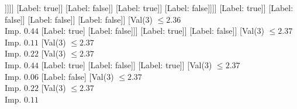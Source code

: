 \documentclass[margin=10pt]{standalone}
\begin{document}
\begin{forest}
																			[Val($3$) $ \leq 2.35$ \\ Imp. $0.04$
																				[Val($3$) $ \leq 2.34$ \\ Imp. $0.01$
																					[Label: false]
																					[Val($3$) $ \leq 2.34$ \\ Imp. $0.05$
																						[Label: true]
																						[Val($3$) $ \leq 2.35$ \\ Imp. $0.01$
																							[Val($3$) $ \leq 2.35$ \\ Imp. $0.07$
																								[Val($3$) $ \leq 2.34$ \\ Imp. $0.02$
																									[Val($3$) $ \leq 2.34$ \\ Imp. $0.10$
																										[Val($3$) $ \leq 2.34$ \\ Imp. $0.02$
																											[Label: false]
																											[Val($3$) $ \leq 2.34$ \\ Imp. $0.15$
																												[Label: true]
																												[Val($3$) $ \leq 2.34$ \\ Imp. $0.03$
																													[Label: false]
																													[Val($3$) $ \leq 2.34$ \\ Imp. $0.38$
																														[Label: true]
																														[Label: false]]]]]
																										[Label: true]]
																									[Label: false]]
																								[Label: true]]
																							[Label: false]]]]
																				[Label: true]]
																			[Label: false]]
																		[Label: false]]
																	[Label: false]]
																[Val($3$) $ \leq 2.36$ \\ Imp. $0.44$
																	[Label: true]
																	[Label: false]]]
															[Label: true]]
														[Label: false]]
													[Val($3$) $ \leq 2.37$ \\ Imp. $0.11$
														[Val($3$) $ \leq 2.37$ \\ Imp. $0.22$
															[Val($3$) $ \leq 2.37$ \\ Imp. $0.44$
																[Label: true]
																[Label: false]]
															[Label: true]]
														[Val($3$) $ \leq 2.37$ \\ Imp. $0.06$
															[Label: false]
															[Val($3$) $ \leq 2.37$ \\ Imp. $0.22$
																[Val($3$) $ \leq 2.37$ \\ Imp. $0.11$

\end{forest}
\end{document}
